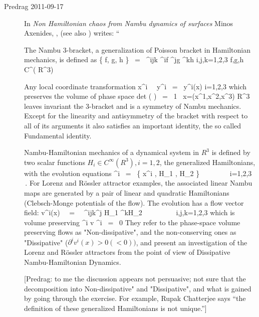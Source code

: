 \begin{description}
\item[Predrag 2011-09-17 ] In
\emph{Non Hamiltonian chaos from Nambu dynamics of surfaces}
Minos Axenides, ,
(see also )
writes: ``

The Nambu 3-bracket, a generalization of Poisson bracket in
Hamiltonian mechanics, is defined as
\beq
\{ f, g, h \} \ = \ \epsilon^{ijk} \partial^{i}f \partial^{j}g \partial^{k}h
\qquad i,j,k=1,2,3 \quad \forall f,g,h \in C^{\infty}( R^{3})

Any local coordinate transformation
\beq
x^{i} \ \rightarrow \ y^{i} \ = \ y^{i}(x) \qquad i=1,2,3
\eeq
which preserves the volume of phase space
\beq
\mbox{det} \left(  \right) \ = \ 1
    \qquad \forall \ x=(x^{1},x^{2},x^{3}) \in R^{3}
\eeq
leaves invariant the 3-bracket and is a symmetry of Nambu mechanics.
Except for the linearity and antisymmetry of the bracket with respect to all of
its arguments it also
satisfies an important identity, the so called Fundamental identity.

Nambu-Hamiltonian mechanics of a dynamical system in $R^{3}$ is defined by
two scalar functions $H_{i}\in C^{\infty}(R^{3}), i=1,2 $, the generalized
Hamiltonians, with the evolution equations
\beq
{}^{i} \ = \  \{ x^{i} , H_{1} , H_{2} \} \ \ \ \ \ \ \ \  i=1,2,3
\,.
\eeq
For Lorenz and R\"{o}ssler attractor examples,
the associated linear Nambu maps are generated by a pair of linear
and quadratic Hamiltonians (Clebsch-Monge potentials of the flow).
The evolution  has a flow vector field:
\beq
v^{i}(x) \ \ = \ \ \epsilon^{ijk}\partial^{j} H_{1} \partial^{k}H_{2} \ \ \ \
\ \ \ \ \ i,j,k=1,2,3
\eeq
which is volume preserving
\beq
\partial^{i} v ^{i} \ = \ 0
\eeq
They refer to the phase-space volume preserving flows as
"Non-dissipative", and the non-conserving ones as "Dissipative"
($\partial^{i} v^{i}(x) > 0(< 0))$, and present an investigation of the
Lorenz and R\"{o}ssler attractors from the point of view of Dissipative
Nambu-Hamiltonian Dynamics.

[Predrag: to me the discussion appears not persuasive; not sure that the
decomposition into  Non-dissipative"  and "Dissipative", and what is
gained by going through the exercise. For example, Rupak Chatterjee says
``the definition of these generalized Hamiltonians is not unique.'']



\end{description}
